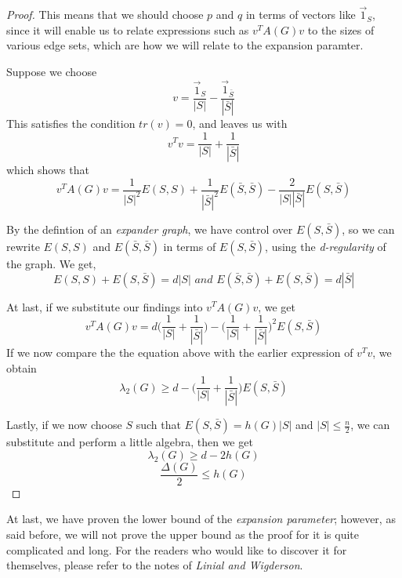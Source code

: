 \documentclass{article}
\theoremstyle{theorem}
\theoremstyle{definition}
\theoremstyle{example}
\theoremstyle{proposition}
\begin{document}
\begin{proof}
            This means that we should choose $p$ and $q$ in terms of vectors like $\vec{1}_S$, since it will enable us to relate expressions such as $v^{T}A(G)v$ to the sizes of various edge sets, which are how we will relate to the expansion paramter.

            Suppose we choose
            \[v = \frac{\vec{1}_S}{|S|} - \frac{\vec{1}_{\bar{S}}}{|\bar{S}|}\]
            This satisfies the condition $tr(v) = 0$, and leaves us with
            \[v^{T}v = \frac{1}{|S|} + \frac{1}{|\bar{S}|}\]
            which shows that
            \[v^{T}A(G)v = \frac{1}{|S|^{2}} E(S,S) + \frac{1}{|\bar{S}|^{2}} E(\bar{S}, \bar{S}) - \frac{2}{|S||\bar{S}|}E(S,\bar{S})\]
            
            By the defintion of an \textit{expander graph}, we have control over $E(S,\bar{S})$, so we can rewrite $E(S,S)$ and $E(\bar{S}, \bar{S})$ in terms of $E(S, \bar{S})$, using the \textit{d-regularity} of the graph. We get,
            \[ E(S,S) + E(S, \bar{S}) = d|S| \textit{ and } E(\bar{S}, \bar{S}) + E(S, \bar{S}) = d|\bar{S}|\]

            At last, if we substitute our findings into $v^{T}A(G)v$, we get
            \[v^{T}A(G)v = d\Big(\frac{1}{|S|} + \frac{1}{|\bar{S}|}\Big) - \Big(\frac{1}{|S|} + \frac{1}{|\bar{S}|}\Big)^{2}E(S, \bar{S})\]
            If we now compare the the equation above with the earlier expression of $v^{T}v$, we obtain
            \[\lambda_2(G) \geq d - \Big(\frac{1}{|S|} + \frac{1}{|\bar{S}|}\Big) E(S, \bar{S})\]

            Lastly, if we now choose $S$ such that $E(S, \bar{S}) = h(G)|S|$ and $|S| \leq \frac{n}{2}$,
            we can substitute and perform a little algebra, then we get
            \[\lambda_2(G) \geq d - 2h(G)\]
            \[\frac{\Delta(G)}{2} \leq h(G)\]
        \end{proof}

        At last, we have proven the lower bound of the \textit{expansion parameter}; however, as said before, we will not prove the upper bound as the proof for it is quite complicated and long. For the readers who would like to discover it for themselves, please refer to the notes of \textit{Linial and Wigderson}.
\end{document}
